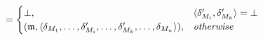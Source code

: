 \begin{definition}
\begin{align*}
        &
        \formulaskip
        = 
        \begin{cases}
            \bot, & 
                \tupled{\change{\metamodel{M}{i}}', \change{\metamodel{M}{k}}'} = \bot \\
            (\modeltuple{m}, \tupled{\change{\metamodel{M}{1}}, \dots, \change{\metamodel{M}{i}}' %
            , \dots, \change{\metamodel{M}{k}}'%
            , \dots, \change{\metamodel{M}{n}}}), & 
                \otherwisemath
        \end{cases}
    \end{align*}
\end{definition}

